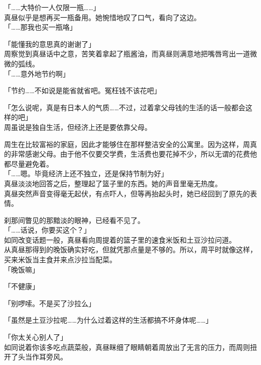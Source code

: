 「……大特价一人仅限一瓶……」\\

真昼似乎是想再买一瓶备用。她惋惜地叹了口气，看向了这边。\\

「……那我也买一瓶咯」

「能懂我的意思真的谢谢了」\\

周察觉到真昼话中之意，苦笑着拿起了瓶酱油，而真昼则满意地把嘴唇弯出一道微微的弧线。\\

「……意外地节约啊」

「节约……不如说是能省就省吧。冤枉钱不该花吧」

「怎么说呢，真是有日本人的气质……不过，过着拿父母钱的生活的话一般都会这样的吧」\\

周虽说是独自生活，但经济上还是要依靠父母。

周生在比较富裕的家庭，因此才能够住在那样整洁安全的公寓里。因为这样，周真的非常感谢父母。由于他不仅要交学费，生活费也要花掉不少，所以无谓的花费他都尽量避免着。\\

「……嗯。毕竟经济上还不独立，还是保持节制为好」\\

真昼淡淡地回答之后，整理起了篮子里的东西。她的声音里毫无热度。\\

真昼突然声音变得毫无起伏，有点吓人，但等再抬起头时，她已经回到了原先的表情。

刹那间瞥见的那黯淡的眼神，已经看不见了。\\

「……话说，你要买这个？」\\

如同改变话题一般，真昼看向周提着的篮子里的速食米饭和土豆沙拉问道。\\

从真昼那得到的晚饭确实好吃，但就凭那点量是不够的。所以，周平时就像这样，买来米饭当主食并来点沙拉当配菜。\\

「晚饭嘛」

「不健康」

「别啰嗦。不是买了沙拉么」

「虽然是土豆沙拉呢……为什么过着这样的生活都搞不坏身体呢……」

「你太关心别人了」\\

如同说着你该多吃点蔬菜般，真昼眯细了眼睛朝着周放出了无言的压力，而周则扭开了头当作耳旁风。\\


